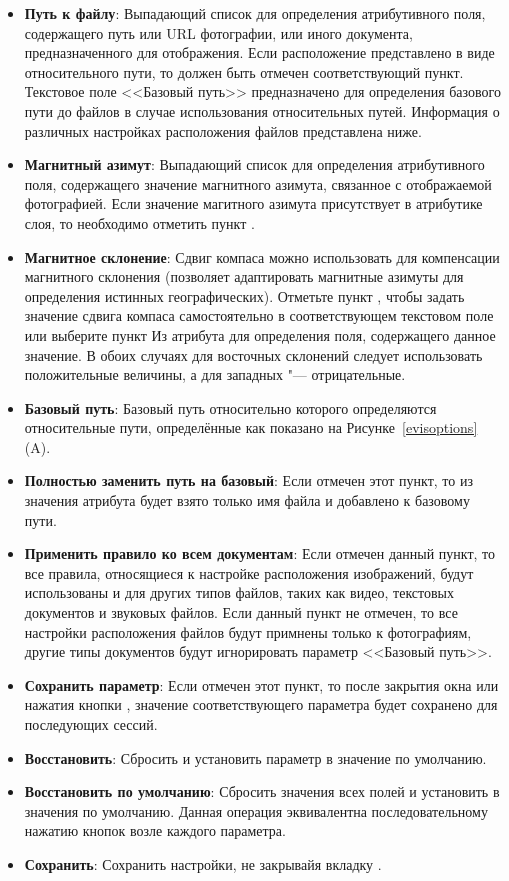 \begin{itemize}[label=--]
\item \textbf{Путь к файлу}: Выпадающий список для определения атрибутивного
поля, содержащего путь или URL фотографии, или иного документа,
предназначенного для отображения. Если расположение представлено в виде
относительного пути, то должен быть отмечен соответствующий пункт.
Текстовое поле <<Базовый путь>> предназначено для определения базового пути до
файлов в случае использования относительных путей. Информация о
различных настройках расположения файлов представлена ниже.
\item \textbf{Магнитный азимут}: Выпадающий список для определения
атрибутивного поля, содержащего значение магнитного азимута, связанное с
отображаемой фотографией. Если значение магитного азимута присутствует в
атрибутике слоя, то необходимо отметить пункт .
\item \textbf{Магнитное склонение}: Сдвиг компаса можно использовать для
компенсации магнитного склонения (позволяет адаптировать магнитные азимуты для
определения истинных географических). Отметьте пункт ,
чтобы задать значение сдвига компаса самостоятельно в соответствующем текстовом
поле или выберите пункт Из атрибута для определения поля, содержащего данное
значение. В обоих случаях для восточных склонений следует использовать
положительные величины, а для западных "--- отрицательные.
\item \textbf{Базовый путь}: Базовый путь относительно которого определяются
относительные пути, определённые как показано на Рисунке~\ref{evisoptions} (A).
\item \textbf{Полностью заменить путь на базовый}: Если отмечен этот пункт,
то из значения атрибута будет взято только имя файла и добавлено к базовому
пути.
\item \textbf{Применить правило ко всем документам}: Если отмечен данный
пункт, то все правила, относящиеся к настройке расположения изображений, будут
использованы и для других типов файлов, таких как видео, текстовых документов и
звуковых файлов. Если данный пункт не отмечен, то все настройки расположения
файлов будут примнены только к фотографиям, другие типы документов будут
игнорировать параметр <<Базовый путь>>.
\item \textbf{Сохранить параметр}: Если отмечен этот пункт, то
после закрытия окна или нажатия кнопки , значение соответствующего
параметра будет сохранено для последующих сессий.
\item \textbf{Восстановить}: Сбросить и установить параметр в значение по
умолчанию.
\item \textbf{Восстановить по умолчанию}: Сбросить значения всех полей и
установить в значения по умолчанию. Данная операция эквивалентна
последовательному нажатию кнопок  возле каждого параметра.
\item \textbf{Сохранить}: Сохранить настройки, не закрывайя вкладку
.
\end{itemize}

